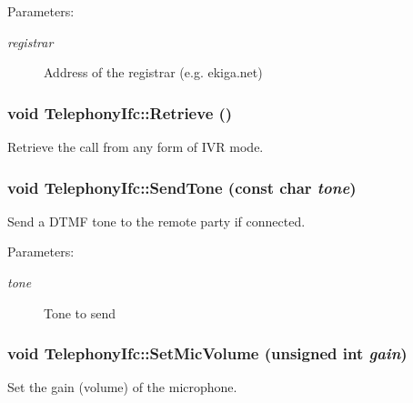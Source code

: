 \begin{Desc}
\item[Parameters:]
\begin{description}
\item[{\em registrar}]Address of the registrar (e.g. ekiga.net) \end{description}
\end{Desc}
\hypertarget{classTelephonyIfc_e5318586774b3cae6afd9bd3596ac0a6}{
\subsubsection[{Retrieve}]{\setlength{\rightskip}{0pt plus 5cm}void TelephonyIfc::Retrieve ()}}
\label{classTelephonyIfc_e5318586774b3cae6afd9bd3596ac0a6}


Retrieve the call from any form of IVR mode. 

\hypertarget{classTelephonyIfc_ac6179d75a2c623e05ccb345b45741f1}{
\subsubsection[{SendTone}]{\setlength{\rightskip}{0pt plus 5cm}void TelephonyIfc::SendTone (const char {\em tone})}}
\label{classTelephonyIfc_ac6179d75a2c623e05ccb345b45741f1}


Send a DTMF tone to the remote party if connected. 

\begin{Desc}
\item[Parameters:]
\begin{description}
\item[{\em tone}]Tone to send \end{description}
\end{Desc}
\hypertarget{classTelephonyIfc_9c7068e7f0ef2d4498272b4a20361d4c}{
\subsubsection[{SetMicVolume}]{\setlength{\rightskip}{0pt plus 5cm}void TelephonyIfc::SetMicVolume (unsigned int {\em gain})}}
\label{classTelephonyIfc_9c7068e7f0ef2d4498272b4a20361d4c}


Set the gain (volume) of the microphone. 


